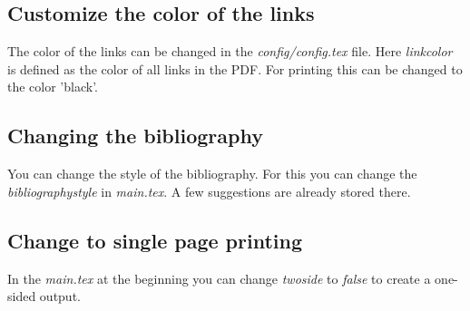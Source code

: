 \subsection{Customize the color of the links}
The color of the links can be changed in the \textit{config/config.tex} file. Here \textit{linkcolor} is defined as the color of all links in the PDF.
For printing this can be changed to the color 'black'.

\subsection{Changing the bibliography}
You can change the style of the bibliography. For this you can change the \textit{bibliographystyle} in \textit{main.tex}. A few suggestions are already stored there.

\subsection{Change to single page printing}
In the \textit{main.tex} at the beginning you can change \textit{twoside} to \textit{false} to create a one-sided output.